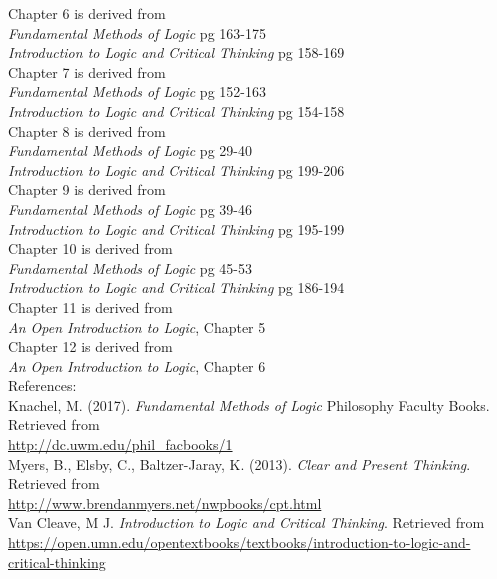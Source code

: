 \documentclass[twoside, openright]{book}
\begin{document}
Chapter 6 is derived from \\
\emph{Fundamental Methods of Logic} pg 163-175 \\
\emph{Introduction to Logic and Critical Thinking} pg 158-169 \\

Chapter 7 is derived from \\
\emph{Fundamental Methods of Logic} pg 152-163 \\
\emph{Introduction to Logic and Critical Thinking} pg 154-158 \\

Chapter 8 is derived from \\
\emph{Fundamental Methods of Logic} pg 29-40 \\
\emph{Introduction to Logic and Critical Thinking} pg 199-206 \\


Chapter 9 is derived from \\
\emph{Fundamental Methods of Logic} pg 39-46 \\
\emph{Introduction to Logic and Critical Thinking} pg 195-199 \\

Chapter 10 is derived from \\
\emph{Fundamental Methods of Logic} pg 45-53 \\
\emph{Introduction to Logic and Critical Thinking} pg 186-194 \\

Chapter 11 is derived from \\ 
\emph{An Open Introduction to Logic}, Chapter 5 \\

Chapter 12 is derived from \\ 
\emph{An Open Introduction to Logic}, Chapter 6 \\

References: \\

Knachel, M. (2017).  \emph{Fundamental Methods of Logic} Philosophy Faculty Books. Retrieved from \\
\url{http://dc.uwm.edu/phil_facbooks/1} \\

Myers, B., Elsby, C., Baltzer-Jaray, K. (2013). \emph{Clear and Present Thinking}. Retrieved from \\
\url{http://www.brendanmyers.net/nwpbooks/cpt.html} \\

Van Cleave, M J. \emph{Introduction to Logic and Critical Thinking}. Retrieved from \\
\url{https://open.umn.edu/opentextbooks/textbooks/introduction-to-logic-and-critical-thinking} \\
\end{document}
